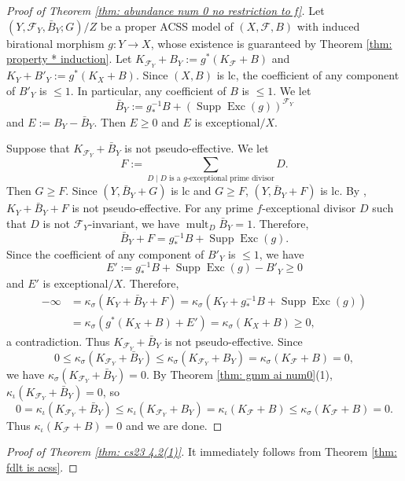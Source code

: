 \documentclass[11pt]{amsart}
\numberwithin{equation}{section}
\newcommand{\Exc}{\operatorname{Exc}}
\newcommand{\Supp}{\operatorname{Supp}}
\newcommand{\mult}{\operatorname{mult}}
\newcommand{\Ff}{\mathcal{F}}
\theoremstyle{definition}
\theoremstyle{definition}
\theoremstyle{definition}
\begin{document}
\begin{proof}[Proof of Theorem \ref{thm: abundance num 0 no restriction to f}]
Let $(Y,\Ff_Y,\bar B_Y;G)/Z$ be a proper ACSS model of $(X,\Ff,B)$ with induced birational morphism $g: Y\rightarrow X$, whose existence is guaranteed by Theorem \ref{thm: property * induction}. Let $K_{\Ff_Y}+B_Y:=g^*(K_{\Ff}+B)$ and $K_Y+B'_Y:=g^*(K_X+B)$. Since $(X,B)$ is lc, the coefficient of any component of $B'_Y$ is $\leq 1$. In particular, any coefficient of $B$ is $\leq 1$. We let
$$\bar B_Y:=g^{-1}_*B+(\Supp\Exc(g))^{\Ff_Y}$$
and $E:=B_Y-\bar B_Y$. Then $E\geq 0$ and $E$ is exceptional$/X$.

Suppose that $K_{\Ff_Y}+\bar B_Y$ is not pseudo-effective. We let
$$F:=\sum_{D\mid D\text{ is a }g\text{-exceptional prime divisor}}D.$$
Then $G\geq F$. Since $(Y,\bar B_Y+G)$ is lc and $G\geq F$, $(Y,\bar B_Y+F)$ is lc. By \cite[Theorem 5.3]{ACSS21}, $K_Y+\bar B_Y+F$ is not pseudo-effective.  For any prime $f$-exceptional divisor $D$ such that $D$ is not $\Ff_Y$-invariant, we have $\mult_D\bar B_Y=1$. Therefore, 
$$\bar B_Y+F=g^{-1}_*B+\Supp\Exc(g).$$
Since the coefficient of any component of $B'_Y$ is $\leq 1$, we have
$$E':=g^{-1}_*B+\Supp\Exc(g)-B'_Y\geq 0$$
and $E'$ is exceptional$/X$. Therefore, 
\begin{align*}
    -\infty&=\kappa_{\sigma}(K_Y+\bar B_Y+F)=\kappa_{\sigma}(K_Y+g^{-1}_*B+\Supp\Exc(g))\\
    &=\kappa_{\sigma}(g^*(K_X+B)+E')=\kappa_{\sigma}(K_X+B)\geq 0,
\end{align*}
a contradiction. Thus $K_{\Ff_Y}+\bar B_Y$ is not pseudo-effective. Since
$$0\leq\kappa_{\sigma}(K_{\Ff_Y}+\bar B_Y)\leq\kappa_{\sigma}(K_{\Ff_Y}+B_Y)=\kappa_{\sigma}(K_{\Ff}+B)=0,$$
we have $\kappa_{\sigma}(K_{\Ff_Y}+\bar B_Y)=0$. By Theorem \ref{thm: gmm ai num0}(1), $\kappa_{\iota}(K_{\Ff_Y}+\bar B_Y)=0$, so 
$$0=\kappa_{\iota}(K_{\Ff_Y}+\bar B_Y)\leq \kappa_{\iota}(K_{\Ff_Y}+B_Y)= \kappa_{\iota}(K_{\Ff}+B)\leq \kappa_{\sigma}(K_{\Ff}+B)=0.$$
Thus $\kappa_{\iota}(K_{\Ff}+B)=0$ and we are done.
\end{proof}

\begin{proof}[Proof of Theorem \ref{thm: cs23 4.2(1)}]
    It immediately follows from Theorem \ref{thm: fdlt is acss}.
\end{proof}
\end{document}

